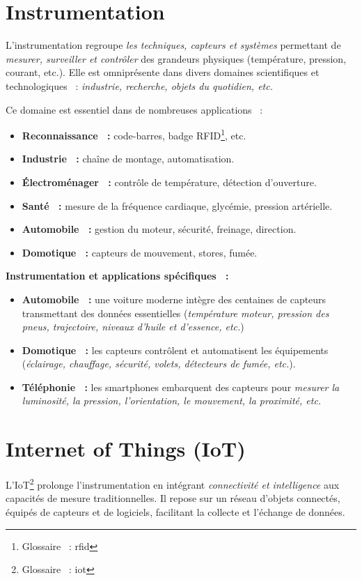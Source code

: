  \label{chIntroduction}

\section{Instrumentation}
L'instrumentation regroupe \emph{les techniques, capteurs et systèmes} permettant 
de \emph{mesurer, surveiller et contrôler} des grandeurs physiques (température, pression, courant, etc.). Elle est omniprésente dans divers domaines scientifiques et technologiques ~: \emph{industrie, recherche, objets du quotidien, etc.}  

Ce domaine est essentiel dans de nombreuses applications ~:  
\begin{itemize}
  \item \textbf{Reconnaissance ~:} code-barres, badge RFID\footnote{Glossaire ~: \gls{rfid}}, etc.  
  \item \textbf{Industrie ~:} chaîne de montage, automatisation.  
  \item \textbf{Électroménager ~:} contrôle de température, détection d'ouverture.  
  \item \textbf{Santé ~:} mesure de la fréquence cardiaque, glycémie, pression artérielle.  
  \item \textbf{Automobile ~:} gestion du moteur, sécurité, freinage, direction.  
  \item \textbf{Domotique ~:} capteurs de mouvement, stores, fumée.  
\end{itemize}

\textbf{Instrumentation et applications spécifiques ~:}  
\begin{itemize}
  \item \textbf{Automobile ~:} une voiture moderne intègre des centaines de capteurs transmettant des données essentielles (\emph{température moteur, pression des pneus, trajectoire, niveaux d'huile et d'essence, etc.})
  \item \textbf{Domotique ~:} les capteurs contrôlent et automatisent les équipements (\emph{éclairage, chauffage, sécurité, volets, détecteurs de fumée, etc.}).  
  \item \textbf{Téléphonie ~:} les smartphones embarquent des capteurs pour \emph{mesurer la luminosité, la pression, l'orientation, le mouvement, la proximité, etc.}  
\end{itemize}

\section{Internet of Things (IoT)}
L'IoT\footnote{Glossaire ~: \gls{iot}} prolonge l'instrumentation en intégrant \emph{connectivité et intelligence} aux capacités de mesure traditionnelles. Il repose sur un réseau d'objets connectés, équipés de capteurs et de logiciels, facilitant la collecte et l'échange de données.  

